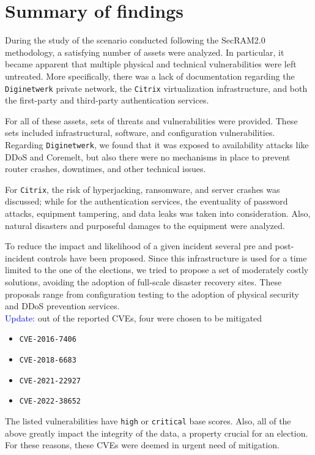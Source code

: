 \chapter*{Summary of findings}

During the study of the scenario conducted following the SecRAM2.0 methodology\cite{article:SecRAM}, a satisfying number of assets were analyzed. In particular, it became apparent that multiple physical and technical vulnerabilities were left untreated.
More specifically, there was a lack of documentation regarding the \texttt{Diginetwerk} private network, the \texttt{Citrix} virtualization infrastructure, and both the first-party and third-party authentication services. 

For all of these assets, sets of threats and vulnerabilities were provided. These sets included infrastructural, software, and configuration vulnerabilities.
Regarding \texttt{Diginetwerk}, we found that it was exposed to availability attacks like DDoS and Coremelt, but also there were no mechanisms in place to prevent router crashes, downtimes, and other technical issues.

For \texttt{Citrix}, the risk of hyperjacking, ransomware, and server crashes was discussed; while for the authentication services, the eventuality of password attacks, equipment tampering, and data leaks was taken into consideration.
Also, natural disasters and purposeful damages to the equipment were analyzed.

To reduce the impact and likelihood of a given incident several pre and post-incident controls have been proposed. Since this infrastructure is used for a time limited to the one of the elections, we tried to propose a set of moderately costly solutions, avoiding the adoption of full-scale disaster recovery sites. These proposals range from configuration testing to the adoption of physical security and DDoS prevention services.\\

\noindent \textcolor{blue}{Update:} out of the reported CVEs, four were chosen to be mitigated

\begin{itemize}
    \item \texttt{CVE-2016-7406}
    \item \texttt{CVE-2018-6683}
    \item \texttt{CVE-2021-22927}
    \item \texttt{CVE-2022-38652}
\end{itemize}

The listed vulnerabilities have \texttt{high} or \texttt{critical} base scores. Also, all of the above greatly impact the integrity of the data, a property crucial for an election. For these reasons, these CVEs were deemed in urgent need of mitigation.

